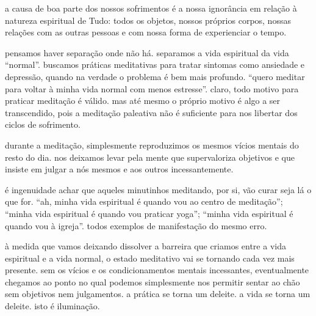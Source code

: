 a causa de boa parte dos nossos sofrimentos é a nossa ignorância em relação à natureza espiritual de Tudo: todos os objetos, nossos próprios corpos, nossas relações com as outras pessoas e com nossa forma de experienciar o tempo.

pensamos haver separação onde não há. separamos a vida espiritual da vida ``normal''. buscamos práticas meditativas para tratar sintomas como ansiedade e depressão, quando na verdade o problema é bem mais profundo. ``quero meditar para voltar à minha vida normal com menos estresse''. claro, todo motivo para praticar meditação é válido. mas até mesmo o próprio motivo é algo a ser transcendido, pois a meditação paleativa não é suficiente para nos libertar dos ciclos de sofrimento.

durante a meditação, simplesmente reproduzimos os mesmos vícios mentais do resto do dia. nos deixamos levar pela mente que supervaloriza objetivos e que insiste em julgar a nós mesmos e aos outros incessantemente.

é ingenuidade achar que aqueles minutinhos meditando, por si, vão curar seja lá o que for. ``ah, minha vida espiritual é quando vou ao centro de meditação''; ``minha vida espiritual é quando vou praticar yoga''; ``minha vida espiritual é quando vou à igreja''. todos exemplos de manifestação do mesmo erro.

à medida que vamos deixando dissolver a barreira que criamos entre a vida espiritual e a vida normal, o estado meditativo vai se tornando cada vez mais presente. sem os vícios e os condicionamentos mentais incessantes, eventualmente chegamos ao ponto no qual podemos simplesmente nos permitir sentar ao chão sem objetivos nem julgamentos. a prática se torna um deleite. a vida se torna um deleite. isto é iluminação.
